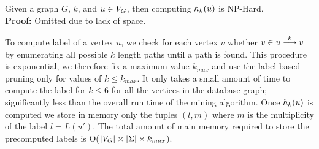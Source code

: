 \begin{thm} Given a graph $G$, $k$, and $u \in \vg$, then 
  computing $\khopl{k}{u}$ is NP-Hard.  \\
{\bf Proof:} Omitted due to lack of space.
%
\end{thm}

To compute \khop label of a vertex $u$, we check for each vertex $v$
whether $v \in \kpath{u}{v}{k}$ by enumerating all possible $k$ length
paths until a path is found.  This procedure is exponential, we
therefore fix a maximum value $k_{max}$ and use the \ncl label based
pruning only for values of $k \leq k_{max}$.  It only takes a small
amount of time to compute the \khop label for $k \leq 6$ for all the
vertices in the database graph; significantly less than the overall run
time of the mining algorithm. Once $\khopl{k}{u}$ is computed we store
in memory only the tuples $(l, m)$ where $m$ is the multiplicity of the
label $l = L(u')$.  The total amount of main memory required to store
the precomputed \khop labels is O($|\vg| \times |\Sigma| \times
k_{max}$).





